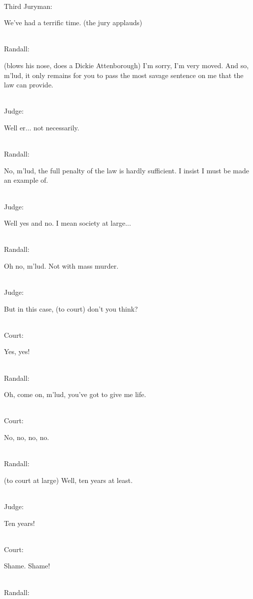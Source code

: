 \documentclass{report}
\begin{document}
\noindent\\ Third Juryman: 	

We've had a terrific time. (the jury applauds)

\noindent\\ Randall: 	

(blows his nose, does a Dickie Attenborough) I'm sorry, I'm very moved. And so, m'lud, it only remains for you to pass the most savage sentence on me that the law can provide.

\noindent\\ Judge: 	

Well er... not necessarily.

\noindent\\ Randall: 	

No, m'lud, the full penalty of the law is hardly sufficient. I insist I must be made an example of.

\noindent\\ Judge: 	

Well yes and no. I mean society at large...

\noindent\\ Randall: 	

Oh no, m'lud. Not with mass murder.

\noindent\\ Judge: 	

But in this case, (to court) don't you think?

\noindent\\ Court: 	

Yes, yes!

\noindent\\ Randall: 	

Oh, come on, m'lud, you've got to give me life.

\noindent\\ Court: 	

No, no, no, no.

\noindent\\ Randall: 	

(to court at large) Well, ten years at least.

\noindent\\ Judge: 	

Ten years!

\noindent\\ Court: 	

Shame. Shame!

\noindent\\ Randall: 	
\end{document}
